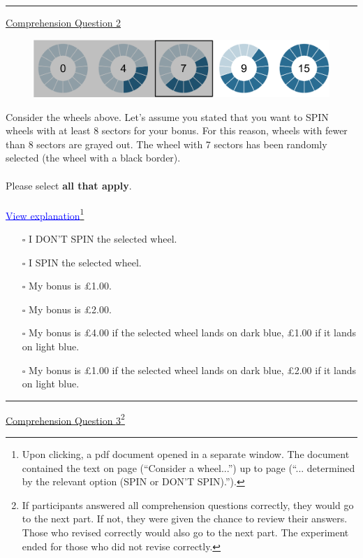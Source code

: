 \noindent \rule{\linewidth}{0.4pt}
\newpage
\noindent \underline{Comprehension Question 2}

\begin{figure}[h!]
	\centering
	{\includegraphics[width=\linewidth]{five_wheelsS2_15.pdf}}
\end{figure}
 
\noindent Consider the wheels above.
Let's assume you stated that you want to SPIN wheels with at least 8 sectors for your bonus.
For this reason, wheels with fewer than 8 sectors are grayed out.
The wheel with 7 sectors has been randomly selected (the wheel with a black border).\\
\\
\noindent Please select \textbf{all that apply}.\\
 \\
\noindent \textcolor{blue}{\underline{View explanation}}\footnote{
Upon clicking, a pdf document opened in a separate window.
The document contained the text on page \pageref{explanation} (``Consider a wheel...'') up to page \pageref{end} (``... determined by the relevant option (SPIN or DON'T SPIN).'').
}\\
\begin{itemize}
\item[$\square$] I DON'T SPIN the selected wheel.
\item[$\square$] I SPIN the selected wheel.
\item[$\square$] My bonus is £1.00.
\item[$\square$] My bonus is £2.00.
\item[$\square$] My bonus is £4.00 if the selected wheel lands on dark blue, £1.00 if it lands on light blue.
\item[$\square$] My bonus is £1.00 if the selected wheel lands on dark blue, £2.00 if it lands on light blue.
\end{itemize}

\noindent \rule{\linewidth}{0.4pt}
\newpage
\noindent \underline{Comprehension Question 3}\footnote{
If participants answered all comprehension questions correctly, they would go to the next part.
If not, they were given the chance to review their answers.
Those who revised correctly would also go to the next part.
The experiment ended for those who did not revise correctly.
}
 
